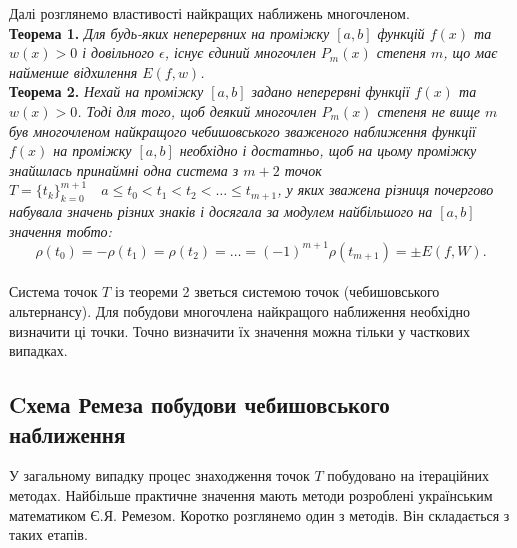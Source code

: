 \documentclass[ukrainian,14pt]{extarticle}
\def\ab{[a,b]}
\begin{document}
Далі розглянемо властивості найкращих наближень многочленом.\\

\noindent
\textbf{Теорема 1.}\textit{
Для будь-яких неперервних на проміжку $[a,b]$ функцій $f(x)$ та $w(x) > 0$ і довільного $\epsilon$, існує єдиний многочлен $P_m(x)$ степеня $m$, що має найменше відхилення $E(f,w)$.}\\

\noindent
\textbf{Теорема 2.}\textit{
Нехай на проміжку $[a,b]$ задано неперервні функції $f(x)$ та $w(x) > 0$.
Тоді для того, щоб деякий многочлен $P_m(x)$ степеня не вище $m$ був многочленом найкращого чебишовського зваженого наближення функції $f(x)$ на проміжку $\ab$ необхідно і достатньо, щоб на цьому проміжку знайшлась принаймні одна система з $m+2$ точок \\ $T=\{t_k\}_{k=0}^{m+1} \quad a \leq t_0 < t_1 < t_2 < \ldots \leq t_{m+1}$, у яких зважена різниця  почергово набувала значень різних знаків і досягала за модулем найбільшого на $\ab$ значення тобто:
}
\begin{equation}\label{eq:formula5}
\rho(t_0) = -\rho(t_1) = \rho(t_2) = \ldots = (-1)^{m+1}\rho(t_{m+1}) = \pm E(f,W).
\end{equation}\\


Система точок $T$ із теореми 2 зветься системою точок (чебишовського альтернансу). Для побудови многочлена найкращого наближення  необхідно визначити ці точки. Точно визначити їх значення можна тільки у часткових випадках. 

\subsection{Cхема Ремеза побудови чебишовського наближення}

У загальному випадку процес знаходження точок $T$ побудовано на ітераційних методах. Найбільше практичне значення мають методи розроблені українським математиком Є.Я. Ремезом. Коротко розглянемо один з методів. Він складається з таких етапів.
\end{document}
